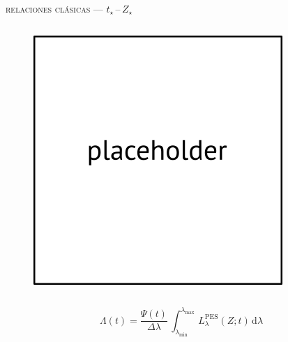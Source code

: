 \documentclass[xcolor=dvipsnames,fleqn,hyperref={colorlinks,citecolor=black,linkcolor=black,urlcolor=black}]{beamer}
\begin{document}
\begin{frame}{\textsc{relaciones clásicas --- $t_\star\,$--$\,Z_\star$}}
\begin{columns}
%
\begin{figure}
\includegraphics[scale=1]{img/placeholder}
\end{figure}
\end{columns}

$$\Lambda(t) = \frac{\Psi(t)}{\Delta\lambda}\,\int_{\lambda_\text{min}}^{\lambda_\text{max}}\,L_\lambda^\text{PES}(Z;t)\,\text{d}\lambda$$

\end{frame}
\end{document}
